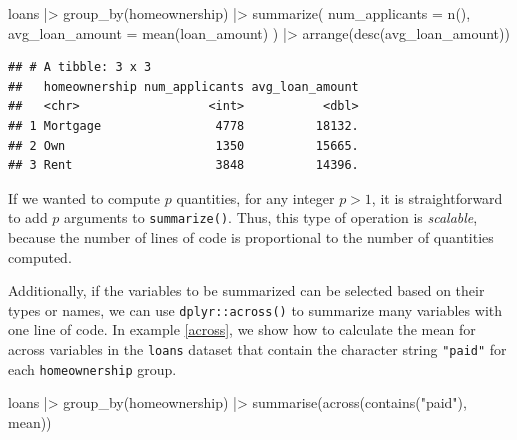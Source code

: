\documentclass[12pt]{article}
\newenvironment{Shaded}{\begin{snugshade}}{\end{snugshade}}
\newcommand{\AttributeTok}[1]{\textcolor[rgb]{0.77,0.63,0.00}{#1}}
\newcommand{\FunctionTok}[1]{\textcolor[rgb]{0.00,0.00,0.00}{#1}}
\newcommand{\NormalTok}[1]{#1}
\newcommand{\SpecialCharTok}[1]{\textcolor[rgb]{0.00,0.00,0.00}{#1}}
\newcommand{\StringTok}[1]{\textcolor[rgb]{0.31,0.60,0.02}{#1}}
\begin{document}
\begin{Shaded}
\begin{Highlighting}[]
\NormalTok{loans }\SpecialCharTok{|\textgreater{}}
  \FunctionTok{group\_by}\NormalTok{(homeownership) }\SpecialCharTok{|\textgreater{}}
  \FunctionTok{summarize}\NormalTok{(}
    \AttributeTok{num\_applicants =} \FunctionTok{n}\NormalTok{(),}
    \AttributeTok{avg\_loan\_amount =} \FunctionTok{mean}\NormalTok{(loan\_amount)}
\NormalTok{  ) }\SpecialCharTok{|\textgreater{}}
  \FunctionTok{arrange}\NormalTok{(}\FunctionTok{desc}\NormalTok{(avg\_loan\_amount))}
\end{Highlighting}
\end{Shaded}

\begin{verbatim}
## # A tibble: 3 x 3
##   homeownership num_applicants avg_loan_amount
##   <chr>                  <int>           <dbl>
## 1 Mortgage                4778          18132.
## 2 Own                     1350          15665.
## 3 Rent                    3848          14396.
\end{verbatim}


\label{tidy-summary-again} \linespread{2}
\vspace{3mm}\setlength{\parindent}{15pt}

If we wanted to compute \(p\) quantities, for any integer \(p > 1\), it
is straightforward to add \(p\) arguments to \texttt{summarize()}. Thus,
this type of operation is \emph{scalable}, because the number of lines
of code is proportional to the number of quantities computed.

Additionally, if the variables to be summarized can be selected based on
their types or names, we can use \texttt{dplyr::across()} to summarize
many variables with one line of code. In example \ref{across}, we show
how to calculate the mean for across variables in the \texttt{loans}
dataset that contain the character string \texttt{"paid"} for each
\texttt{homeownership} group.

\linespread{1}

\begin{Shaded}
\begin{Highlighting}[]
\NormalTok{loans }\SpecialCharTok{|\textgreater{}} 
  \FunctionTok{group\_by}\NormalTok{(homeownership) }\SpecialCharTok{|\textgreater{}} 
  \FunctionTok{summarise}\NormalTok{(}\FunctionTok{across}\NormalTok{(}\FunctionTok{contains}\NormalTok{(}\StringTok{"paid"}\NormalTok{), mean))}
\end{Highlighting}
\end{Shaded}
\end{document}
